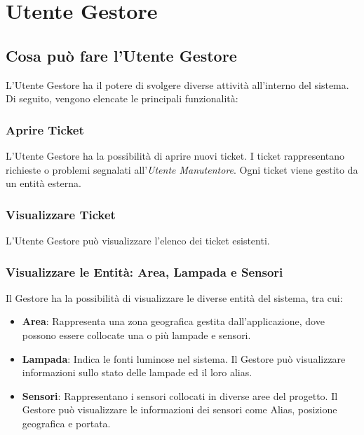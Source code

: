 \chapter{Utente Gestore}

\section{Cosa può fare l'Utente Gestore}
L'Utente Gestore ha il potere di svolgere diverse attività all'interno del sistema. Di seguito, vengono elencate le principali funzionalità:

\subsection{Aprire Ticket}
L'Utente Gestore ha la possibilità di aprire nuovi ticket. 
I ticket rappresentano richieste o problemi segnalati all'\textit{Utente Manutentore}.
Ogni ticket viene gestito da un entità esterna.

\subsection{Visualizzare Ticket}
L'Utente Gestore può visualizzare l'elenco dei ticket esistenti. 

\subsection{Visualizzare le Entità: Area, Lampada e Sensori}
Il Gestore ha la possibilità di visualizzare le diverse entità del sistema, tra cui:
\begin{itemize}
\item \textbf{Area}: Rappresenta una zona geografica gestita dall'applicazione, dove possono essere collocate una o più lampade e sensori. 
\item \textbf{Lampada}: Indica le fonti luminose nel sistema. Il Gestore può visualizzare informazioni sullo stato delle lampade ed il loro alias.
\item \textbf{Sensori}: Rappresentano i sensori collocati in diverse aree del progetto. Il Gestore può visualizzare le informazioni dei sensori come Alias, posizione geografica e portata.
\end{itemize}

